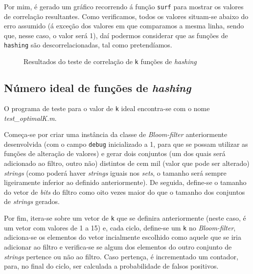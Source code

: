 \documentclass[a4paper,11pt,openright,oneside]{report}
\begin{document}
Por mim, é gerado um gráfico recorrendo á função \texttt{surf} para mostrar os valores de correlação resultantes. Como verificamos, todos os valores situam-se abaixo do erro assumido (á exceção dos valores em que comparamos a mesma linha, sendo que, nesse caso, o valor será 1), daí podermos considerar que as funções de \texttt{hashing} são descorrelacionadas, tal como pretendíamos.

\begin{figure}[ht]	
\center
{}
\caption{Resultados do teste de correlação de \texttt{k} funções de \textit{hashing}}
\label{fig:hashcorr}
\end{figure}

\subsection{Número ideal de funções de \textit{hashing}}
\label{subsec.optimalk}

O programa de teste para o valor de \texttt{k} ideal encontra-se com o nome \textit{test_optimalK.m}.

Começa-se por criar uma instância da classe de \textit{Bloom-filter} anteriormente desenvolvida (com o campo \texttt{debug} inicializado a 1, para que se possam utilizar as funções de alteração de valores) e gerar dois conjuntos (um dos quais será adicionado ao filtro, outro não) distintos de cem mil (valor que pode ser alterado) \textit{strings} (como poderá haver \textit{strings} iguais nos \textit{sets}, o tamanho será sempre ligeiramente inferior ao definido anteriormente). De seguida, define-se o tamanho do vetor de \textit{bits} do filtro como oito vezes maior do que o tamanho dos conjuntos de \textit{strings} gerados.

Por fim, itera-se sobre um vetor de \texttt{k} que se definira anteriormente (neste caso, é um vetor com valores de 1 a 15) e, cada ciclo, define-se um \texttt{k} no \textit{Bloom-filter}, adiciona-se os elementos do vetor incialmente escolhido como aquele que se iria adicionar ao filtro e verifica-se se algum dos elementos do outro conjunto de \textit{strings} pertence ou não ao filtro. Caso pertença, é incrementado um contador, para, no final do ciclo, ser calculada a probabilidade de falsos positivos.
\end{document}

